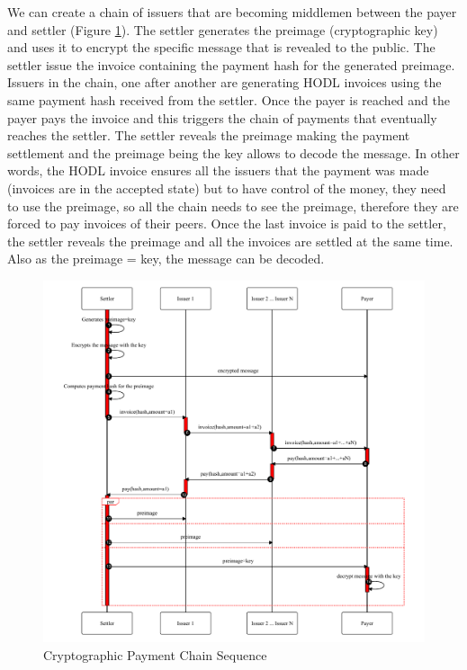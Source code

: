 \documentclass{article}
\begin{document}
We can create a chain of issuers that are becoming middlemen between the payer and settler (Figure \ref{fig:cryptopaychain}). The settler generates the preimage (cryptographic key) and uses it to encrypt the specific message that is revealed to the public. The settler issue the invoice containing the payment hash for the generated preimage. Issuers in the chain, one after another are generating HODL invoices using the same payment hash received from the settler. Once the payer is reached and the payer pays the invoice and this triggers the chain of payments that eventually reaches the settler. The settler reveals the preimage making the payment settlement and the preimage being the key allows to decode the message. In other words, the HODL invoice ensures all the issuers that the payment was made (invoices are in the accepted state) but to have control of the money, they need to use the preimage, so all the chain needs to see the preimage, therefore they are forced to pay invoices of their peers. Once the last invoice is paid to the settler, the settler reveals the preimage and all the invoices are settled at the same time. Also as the preimage = key, the message can be decoded.


\begin{figure}
	\centering
	\includegraphics[scale=0.7]{PaymentChain.pdf}
	\caption{Cryptographic Payment Chain Sequence}
	\label{fig:cryptopaychain}
\end{figure}
\end{document}
